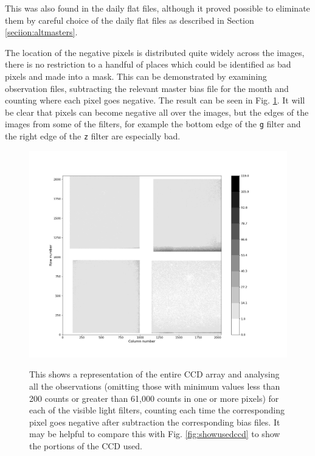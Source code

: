 This was also found in the daily flat files, although it proved possible to
eliminate them by careful choice of the daily  flat files as described in
Section \ref{seciion:altmasters}.

The location of the negative pixels is distributed quite widely across the
images, there is no restriction to a handful of places which could be identified
as bad pixels and made into a mask. This can be demonstrated by examining
observation files, subtracting the relevant master bias file for the month and
counting where each pixel goes negative. The result can be seen in Fig.
\ref{fig:negpixloc}. It will be clear that pixels can become negative all over
the images, but the edges of the images from some of the filters, for example
the bottom edge of the \texttt{g} filter and the right edge of the \texttt{z}
filter are especially bad.

\begin{figure}[!htbp]
\begin{center}
\includegraphics[scale=0.4]{images/min200negpix.png}
\end{center}   
\caption{This shows a representation of the entire CCD array and
analysing all the observations (omitting those with minimum values less than
200 counts or greater than 61,000 counts in one or more pixels) for each of the
visible light filters, counting each time the corresponding pixel goes negative
after subtraction the corresponding bias files. It may be helpful to compare this with Fig.
\ref{fig:showusedccd} to show the portions of the CCD used.}
\protect\label{fig:negpixloc}
\end{figure}

